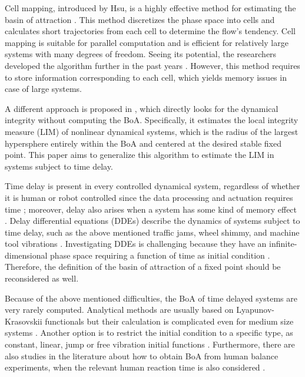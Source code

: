 \documentclass[preprint,12pt]{elsarticle}
\begin{document}
	Cell mapping, introduced by Hsu, is a highly effective method for estimating the basin of attraction \cite{hsu1980theory,hsu1986cell,hsu2013cell}. This method discretizes the phase space into cells and calculates short trajectories from each cell to determine the flow's tendency. Cell mapping is suitable for parallel computation and is efficient for relatively large systems with many degrees of freedom. Seeing its potential, the researchers developed the algorithm further in the past years \cite{sun2018cell,liu2016global,andonovski2020six}. However, this method requires to store information corresponding to each cell, which yields memory issues in case of large systems.
	
	A different approach is proposed in \cite{habib2021dynamical}, which directly looks for the dynamical integrity without computing the BoA.  Specifically, it estimates the local integrity measure (LIM) of nonlinear dynamical systems, which is the radius of the largest hypersphere entirely within the BoA and centered at the desired stable fixed point. This paper aims to generalize this algorithm to estimate the LIM in systems subject to time delay.
	
	Time delay is present in every controlled dynamical system, regardless of whether it is human or robot controlled since the data processing and actuation requires time \cite{hu2003dynamics,szaksz2022delay,szaksz2022nonlinear}; moreover, delay also arises when a system has some kind of memory effect \cite{sun2017effect,de2020memory,stepan2001modelling}. Delay differential equations (DDEs) describe the dynamics of systems subject to time delay, such as the above mentioned traffic jams, wheel shimmy, and machine tool vibrations \cite{beregi2019bifurcation,orosz2010traffic,szaksz2023delay,altintas2020chatter,stepan2014cylindrical,kiss2022control}. 
	Investigating DDEs is challenging because they have an infinite-dimensional phase space requiring a function of time as initial condition \cite{hale2013introduction,stepan1989retarded}. Therefore, the definition of the basin of attraction of a fixed point should be reconsidered as well.
	
	Because of the above mentioned difficulties, the BoA of time delayed systems are very rarely computed. Analytical methods are usually based on Lyapunov-Krasovskii functionals but their calculation is complicated even for medium size systems \cite{biemond2014estimation}. Another option is to restrict the initial condition to a specific type, as constant, linear, jump or free vibration initial functions \cite{yoshida2021basins,scholl2020norm}.  Furthermore, there are also studies in the literature about how to obtain BoA from human balance experiments, when the relevant human reaction time is also considered \cite{zakynthinaki2010modeling,smith2017basins}.
	
\end{document}
